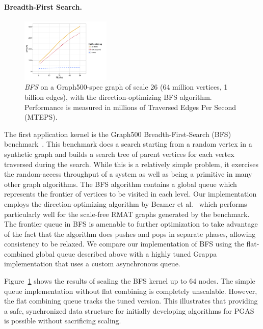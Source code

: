 \paragraph{Breadth-First Search.}
\begin{figure}[t]
  \centering
  \includegraphics[width=0.38\textwidth]{data/plots/bfs_perf.pdf}
  \caption{\emph{BFS} on a Graph500-spec graph of scale 26 (64 million vertices, 1 billion edges), with the direction-optimizing BFS algorithm. Performance is measured in millions of Traversed Edges Per Second (MTEPS).}
  \label{fig:bfs_perf}
\end{figure}
The first application kernel is the Graph500 Breadth-First-Search (BFS) benchmark~\cite{graph500list}. This benchmark does a search starting from a random vertex in a synthetic graph and builds a search tree of parent vertices for each vertex traversed during the search. While this is a relatively simple problem, it exercises the random-access throughput of a system as well as being a primitive in many other graph algorithms. The BFS algorithm contains a global queue which represents the frontier of vertices to be visited in each level.
Our implementation employs the direction-optimizing algorithm by Beamer et al.~\cite{Beamer:Graph500} which performs particularly well for the scale-free RMAT graphs generated by the benchmark.
The frontier queue in BFS is amenable to further optimization to take advantage of the fact that the algorithm does pushes and pops in separate phases, allowing consistency to be relaxed.
We compare our implementation of BFS using the flat-combined global queue described above with a highly tuned Grappa implementation that uses a custom asynchronous queue.

Figure~\ref{fig:bfs_perf} shows the results of scaling the BFS kernel up to 64 nodes. The simple queue implementation without flat combining is completely unscalable. However, the flat combining queue tracks the tuned version. This illustrates that providing a safe, synchronized data structure for initially developing algorithms for PGAS is possible without sacrificing scaling.

